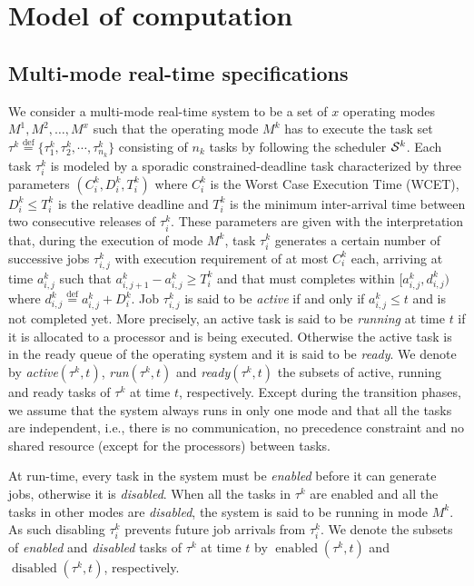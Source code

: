 \documentclass[10pt,english,a4paper]{article}
\newcommand{\enabled}{\operatorname{enabled}}
\newcommand{\disabled}{\operatorname{disabled}}
\newcommand{\equals}{\stackrel{\mathrm{def}}{=}}
\newtheorem{validity test}{Validity Test}
\begin{document}
\section{Model of computation}\label{Model}

\subsection{Multi-mode real-time specifications}

We consider a multi-mode real-time system to be a set of $x$ operating modes $M^1, M^2, \ldots, M^x$ such that the operating mode $M^k$ has to execute the task set $\tau^k \equals \{\tau^k_1, \tau^k_2, \cdots, \tau^k_{n_k}\}$ consisting of $n_k$ tasks by following the scheduler ${\cal S}^k$. Each task $\tau^k_i$ is modeled by a sporadic constrained-deadline task characterized by three parameters $(C^k_i, D^k_i, T^k_i)$ where $C^k_i$ is the Worst Case Execution Time (WCET), $D^k_i \le T^k_i$ is the relative deadline and $T^k_i$ is the minimum inter-arrival time between two consecutive releases of $\tau^k_i$. These parameters are given with the interpretation that, during the execution of mode $M^k$, task $\tau^k_i$ generates a certain number of successive jobs $\tau^k_{i,j}$ with execution requirement of at most $C^k_i$ each, arriving at time $a^k_{i,j}$ such that $a^k_{i,j+1} - a^k_{i,j} \ge T^k_i$ and that must completes within $[a^k_{i,j}, d^k_{i,j})$ where $d^k_{i,j} \equals a^k_{i,j} + D^k_i$. Job $\tau^k_{i,j}$ is said to be {\em active} if and only if $a^k_{i,j} \le t$ and is not completed yet. More precisely, an active task is said to be {\em running} at time $t$ if it is allocated to a processor and is being executed. Otherwise the active task is in the ready queue of the operating system and it is said to be {\em ready}. We denote by {\em active}$(\tau^k, t)$, {\em run}$(\tau^k, t)$ and {\em ready}$(\tau^k, t)$ the subsets of active, running and ready tasks of $\tau^k$ at time $t$, respectively. Except during the transition phases, we assume that the system always runs in only one mode and that all the tasks are independent, i.e., there is no communication, no precedence constraint and no shared resource (except for the processors) between tasks. 

At run-time, every task in the system must be {\em enabled} before it can generate jobs, otherwise it is {\em disabled}. When all the tasks in $\tau^k$ are enabled and all the tasks in other modes are {\em disabled}, the system is said to be running in mode $M^k$. As such disabling $\tau_i^k$ prevents future job arrivals from $\tau_i^k$. We denote the subsets of {\em enabled} and {\em disabled} tasks of $\tau^k$ at time $t$ by $\enabled(\tau^k, t)$ and $\disabled(\tau^k, t)$, respectively.
\end{document}
